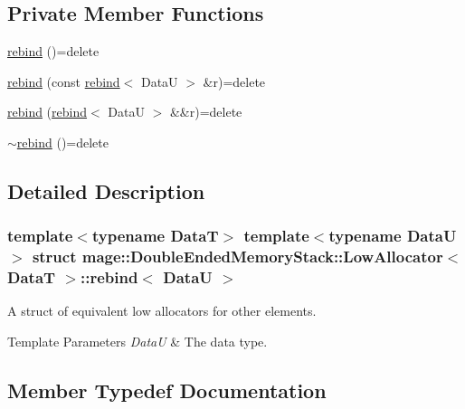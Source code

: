 \subsection*{Private Member Functions}
\begin{DoxyCompactItemize}
\item 
\hyperlink{structmage_1_1_double_ended_memory_stack_1_1_low_allocator_1_1rebind_a0614241d4b05d08ab4bba55ca793bf5c}{rebind} ()=delete
\item 
\hyperlink{structmage_1_1_double_ended_memory_stack_1_1_low_allocator_1_1rebind_a1799f1e7ba9543496e9624d522087695}{rebind} (const \hyperlink{structmage_1_1_double_ended_memory_stack_1_1_low_allocator_1_1rebind}{rebind}$<$ DataU $>$ \&r)=delete
\item 
\hyperlink{structmage_1_1_double_ended_memory_stack_1_1_low_allocator_1_1rebind_abea4a27c89b8c8db309693b80d1023bb}{rebind} (\hyperlink{structmage_1_1_double_ended_memory_stack_1_1_low_allocator_1_1rebind}{rebind}$<$ DataU $>$ \&\&r)=delete
\item 
\hyperlink{structmage_1_1_double_ended_memory_stack_1_1_low_allocator_1_1rebind_a54b1fa630e8a021ced000f950748f707}{$\sim$rebind} ()=delete
\end{DoxyCompactItemize}


\subsection{Detailed Description}
\subsubsection*{template$<$typename DataT$>$\newline
template$<$typename DataU$>$\newline
struct mage\+::\+Double\+Ended\+Memory\+Stack\+::\+Low\+Allocator$<$ Data\+T $>$\+::rebind$<$ Data\+U $>$}

A struct of equivalent low allocators for other elements.


\begin{DoxyTemplParams}{Template Parameters}
{\em DataU} & The data type. \\
\hline
\end{DoxyTemplParams}


\subsection{Member Typedef Documentation}
\hypertarget{structmage_1_1_double_ended_memory_stack_1_1_low_allocator_1_1rebind_ad2d30609df172b2f8759819439a41bfd}{}\label{structmage_1_1_double_ended_memory_stack_1_1_low_allocator_1_1rebind_ad2d30609df172b2f8759819439a41bfd} 
